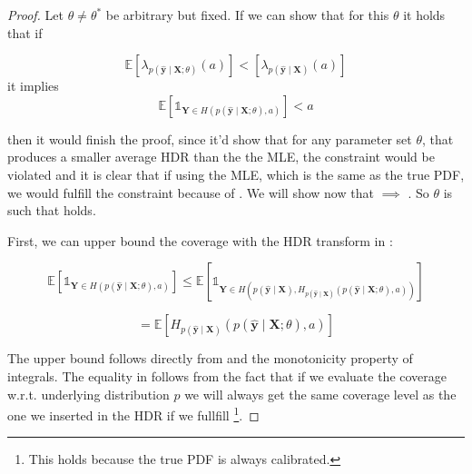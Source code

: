 \begin{proof}
    Let $\theta \neq \theta^*$ be arbitrary but fixed. If we can show that for this $\theta$ it holds that if

    \begin{equation}
        \mathbb{E} \left[ \lambda_{p(\mathbf{\hat{y}}\mid\mathbf{X};\theta)}(a)\right]
        <
        \left[\lambda_{p(\mathbf{\hat{y}}\mid\mathbf{X})}(a) \right]
        \label{eq:inequality_00}
    \end{equation}
    it implies
    \begin{equation}
        \mathbb{E} \left[ \mathds{1}_{\mathbf{Y} \in
        H(p(\mathbf{\hat{y}}\mid \mathbf{X}; \theta), a)} \right] < a
        \label{eq:inequality_01}
    \end{equation}

    then it would finish the proof, since it'd show that for any parameter set $\theta$, that produces a smaller average HDR than the the MLE, the constraint would be violated and it is clear that if using the MLE, which is the same as the true PDF, we would fulfill the constraint because of . We will show now that  $\implies$ . So  $\theta$ is such that  holds.

    First, we can upper bound the coverage with the HDR transform in :

    \begin{equation}
        \mathbb{E} \left[ \mathds{1}_{\mathbf{Y} \in
        H(p(\mathbf{\hat{y}}\mid \mathbf{X}; \theta), a)} \right]
        \leq
        \mathbb{E} \left[ \mathds{1}_{\mathbf{Y} \in
        H(p(\mathbf{\hat{y}} \mid \mathbf{X}), H_{p(\hat{\mathbf{y}}\mid \mathbf{X})}(p(\mathbf{\hat{y}}\mid
        \mathbf{X};
        \theta), a))} \right]
        \label{eq:upper_bound}
    \end{equation}

    \begin{equation}
        = \mathbb{E}\left[H_{p(\hat{\mathbf{y}}\mid \mathbf{X})}(p(\mathbf{\hat{y}}\mid \mathbf{X}; \theta),
            a)
            \right]
        \label{eq:upper_bound_2}
    \end{equation}

    The upper bound follows directly from  and the monotonicity property of integrals. The equality in  follows from the fact that if we evaluate the coverage w.r.t. underlying distribution $p$ we will always get the same coverage level as the one we inserted in the HDR if we fullfill \footnote{This holds because the true PDF is always calibrated.}.


\end{proof}
